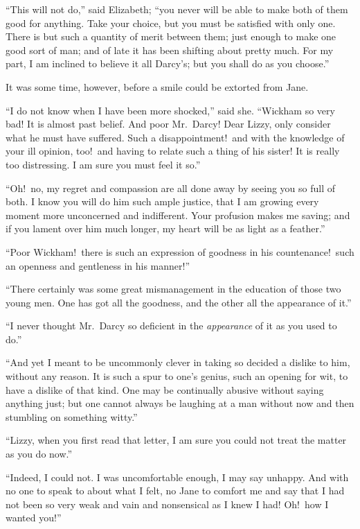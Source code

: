\documentclass[12pt,english,oneside]{book}
\begin{document}
{}``This will not do,'' said Elizabeth; {}``you never will be able
to make both of them good for anything. Take your choice, but you
must be satisfied with only one. There is but such a quantity of merit
between them; just enough to make one good sort of man; and of late
it has been shifting about pretty much. For my part, I am inclined
to believe it all Darcy's; but you shall do as you choose.''

It was some time, however, before a smile could be extorted from Jane.

{}``I do not know when I have been more shocked,'' said she. {}``Wickham
so very bad! It is almost past belief. And poor Mr.\ Darcy! Dear
Lizzy, only consider what he must have suffered. Such a disappointment!\ and
with the knowledge of your ill opinion, too!\ and having to relate
such a thing of his sister! It is really too distressing. I am sure
you must feel it so.''

{}``Oh!\ no, my regret and compassion are all done away by seeing
you so full of both. I know you will do him such ample justice, that
I am growing every moment more unconcerned and indifferent. Your profusion
makes me saving; and if you lament over him much longer, my heart
will be as light as a feather.''

{}``Poor Wickham!\ there is such an expression of goodness in his
countenance!\ such an openness and gentleness in his manner!''\ 

{}``There certainly was some great mismanagement in the education
of those two young men. One has got all the goodness, and the other
all the appearance of it.''

{}``I never thought Mr.\ Darcy so deficient in the \textit{appearance}
of it as you used to do.''

{}``And yet I meant to be uncommonly clever in taking so decided
a dislike to him, without any reason. It is such a spur to one's genius,
such an opening for wit, to have a dislike of that kind. One may be
continually abusive without saying anything just; but one cannot always
be laughing at a man without now and then stumbling on something witty.''

{}``Lizzy, when you first read that letter, I am sure you could not
treat the matter as you do now.''

{}``Indeed, I could not. I was uncomfortable enough, I may say unhappy.
And with no one to speak to about what I felt, no Jane to comfort
me and say that I had not been so very weak and vain and nonsensical
as I knew I had! Oh!\ how I wanted you!''\ 
\end{document}
